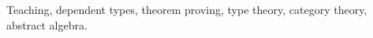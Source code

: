 

\begin{cvparagraph}
    Teaching, dependent types, theorem proving, type theory, category theory, abstract algebra.
\end{cvparagraph}
